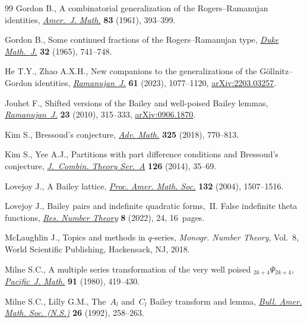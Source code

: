 \documentclass[pdftex]{sigma}
\numberwithin{equation}{section}
\begin{document}
\begin{thebibliography}{99}
Gordon B., A combinatorial generalization of the {R}ogers--{R}amanujan
 identities, \href{https://doi.org/10.2307/2372962}{\textit{Amer.~J. Math.}} \textbf{83} (1961), 393--399.

Gordon B., Some continued fractions of the {R}ogers--{R}amanujan type,
 \href{https://doi.org/10.1215/S0012-7094-65-03278-3}{\textit{Duke Math.~J.}} \textbf{32} (1965), 741--748.

He T.Y., Zhao A.X.H., New companions to the generalizations of the
 {G}\"ollnitz--{G}ordon identities, \href{https://doi.org/10.1007/s11139-023-00715-3}{\textit{Ramanujan~J.}} \textbf{61} (2023),
 1077--1120, \href{https://arxiv.org/abs/2203.03257}{arXiv:2203.03257}.

Jouhet F., Shifted versions of the {B}ailey and well-poised {B}ailey lemmas,
 \href{https://doi.org/10.1007/s11139-010-9282-x}{\textit{Ramanujan~J.}} \textbf{23} (2010), 315--333, \href{https://arxiv.org/abs/0906.1870}{arXiv:0906.1870}.

Kim S., Bressoud's conjecture, \href{https://doi.org/10.1016/j.aim.2017.12.004}{\textit{Adv. Math.}} \textbf{325} (2018),
 770--813.

Kim S., Yee A.J., Partitions with part difference conditions and {B}ressoud's
 conjecture, \href{https://doi.org/10.1016/j.jcta.2014.04.004}{\textit{J.~Combin. Theory Ser.~A}} \textbf{126} (2014), 35--69.

Lovejoy J., A {B}ailey lattice, \href{https://doi.org/10.1090/S0002-9939-03-07247-2}{\textit{Proc. Amer. Math. Soc.}} \textbf{132}
 (2004), 1507--1516.

Lovejoy J., Bailey pairs and indefinite quadratic forms,~{II}. {F}alse
 indefinite theta functions, \href{https://doi.org/10.1007/s40993-022-00324-x}{\textit{Res. Number Theory}} \textbf{8} (2022),
 24, 16~pages.

McLaughlin J., Topics and methods in {$q$}-series, \textit{Monogr. Number
 Theory}, Vol.~8, World Scientific Publishing, Hackensack, NJ, 2018.

Milne S.C., A multiple series transformation of the very well poised
 {${}_{2k+4}\Psi_{2k+4}$}, \href{https://doi.org/10.2140/PJM.1980.91.419}{\textit{Pacific~J. Math.}} \textbf{91} (1980),
 419--430.

Milne S.C., Lilly G.M., The~{$A_l$} and~{$C_l$} {B}ailey transform and lemma,
 \href{https://doi.org/10.1090/S0273-0979-1992-00268-9}{\textit{Bull. Amer. Math. Soc. (N.S.)}} \textbf{26} (1992), 258--263.


\end{thebibliography}
\end{document}
